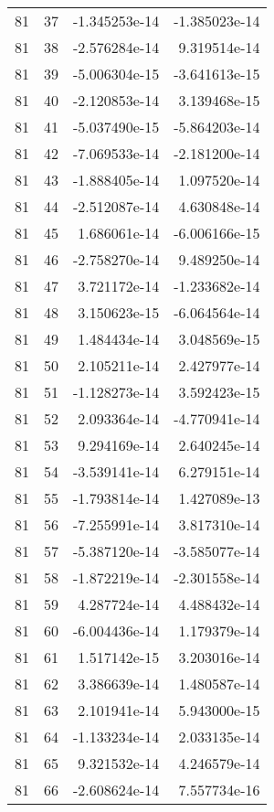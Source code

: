 \begin{tabular}{rrrr}
  81 &   37 & -1.345253e-14 & -1.385023e-14 \\
  81 &   38 & -2.576284e-14 &  9.319514e-14 \\
  81 &   39 & -5.006304e-15 & -3.641613e-15 \\
  81 &   40 & -2.120853e-14 &  3.139468e-15 \\
  81 &   41 & -5.037490e-15 & -5.864203e-14 \\
  81 &   42 & -7.069533e-14 & -2.181200e-14 \\
  81 &   43 & -1.888405e-14 &  1.097520e-14 \\
  81 &   44 & -2.512087e-14 &  4.630848e-14 \\
  81 &   45 &  1.686061e-14 & -6.006166e-15 \\
  81 &   46 & -2.758270e-14 &  9.489250e-14 \\
  81 &   47 &  3.721172e-14 & -1.233682e-14 \\
  81 &   48 &  3.150623e-15 & -6.064564e-14 \\
  81 &   49 &  1.484434e-14 &  3.048569e-15 \\
  81 &   50 &  2.105211e-14 &  2.427977e-14 \\
  81 &   51 & -1.128273e-14 &  3.592423e-15 \\
  81 &   52 &  2.093364e-14 & -4.770941e-14 \\
  81 &   53 &  9.294169e-14 &  2.640245e-14 \\
  81 &   54 & -3.539141e-14 &  6.279151e-14 \\
  81 &   55 & -1.793814e-14 &  1.427089e-13 \\
  81 &   56 & -7.255991e-14 &  3.817310e-14 \\
  81 &   57 & -5.387120e-14 & -3.585077e-14 \\
  81 &   58 & -1.872219e-14 & -2.301558e-14 \\
  81 &   59 &  4.287724e-14 &  4.488432e-14 \\
  81 &   60 & -6.004436e-14 &  1.179379e-14 \\
  81 &   61 &  1.517142e-15 &  3.203016e-14 \\
  81 &   62 &  3.386639e-14 &  1.480587e-14 \\
  81 &   63 &  2.101941e-14 &  5.943000e-15 \\
  81 &   64 & -1.133234e-14 &  2.033135e-14 \\
  81 &   65 &  9.321532e-14 &  4.246579e-14 \\
  81 &   66 & -2.608624e-14 &  7.557734e-16 \\

\end{tabular}
